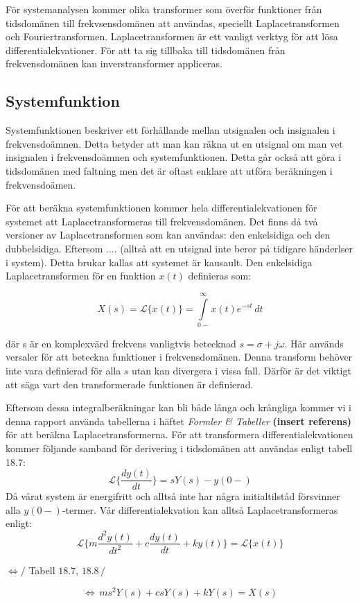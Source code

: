För systemanalysen kommer olika transformer som överför funktioner från tidsdomänen till frekvsensdomänen att användas, speciellt Laplacetransformen och Fouriertransformen.
Laplacetransformen är ett vanligt verktyg för att lösa differentialekvationer. För att ta sig tillbaka till tidsdomänen från frekvensdomänen kan inverstransformer appliceras.

\subsection{Systemfunktion}
Systemfunktionen beskriver ett förhållande mellan utsignalen och insignalen i frekvensdoämnen. Detta betyder att man kan räkna ut en utsignal om man vet insignalen i frekvensdoämnen och systemfunktionen. 
Detta går också att göra i tidsdomänen med faltning men det är oftast enklare att utföra beräkningen i frekvensdoämen.

För att beräkna systemfunktionen kommer hela differentialekvationen för systemet att Laplacetransformeras till frekvensdomänen. Det finns då två versioner av Laplacetransformen som kan användas: den enkelsidiga och den dubbelsidiga.
Eftersom .... (alltså att en utsignal inte beror på tidigare händerlser i system). Detta brukar kallas att systemet är kausault.
Den enkelsidiga Laplacetransformen för en funktion $x(t)$ definieras som:

$$X(s) = \mathcal{L}\big\{x(t)\big\} = \int\limits_{0-}^{\infty} x(t)e^{-st}\,dt$$

där s är en komplexvärd frekvens vanligtvis betecknad $s=\sigma+j\omega$.
Här används versaler för att beteckna funktioner i frekvensdomänen.
Denna transform behöver inte vara definierad för alla $s$ utan kan divergera i vissa fall. Därför är det viktigt att säga vart den transformerade funktionen är definierad. 

Eftersom dessa integralberäkningar kan bli både långa och krångliga kommer vi i denna rapport använda tabellerna i häftet \textit{Formler \& Tabeller}  \textbf{(insert referens)} för att beräkna Laplacetransformerna.
För att transformera differentialekvationen kommer följande samband för derivering i tidsdomänen att användas enligt tabell 18.7:
$$\mathcal{L}\bigg\{\frac{dy(t)}{dt}\bigg\} = sY(s)-y(0-)$$
Då vårat system är energifritt och alltså inte har några initialtilståd försvinner alla $y(0-)$-termer. Vår differentialekvation kan alltså Laplacetransformeras enligt:
$$ \mathcal{L}\bigg\{m\displaystyle\frac{d^2y(t)}{dt^2} + c\displaystyle\frac{dy(t)}{dt} + ky(t)\bigg\}= \mathcal{L}\bigg\{x(t)\bigg\} $$
\begin{center}$ \Longleftrightarrow \bigg/$ Tabell $18.7$, $18.8\,\bigg/$ \end{center}
$$ \Longleftrightarrow\, ms^2Y(s)+csY(s)+kY(s)=X(s)$$

